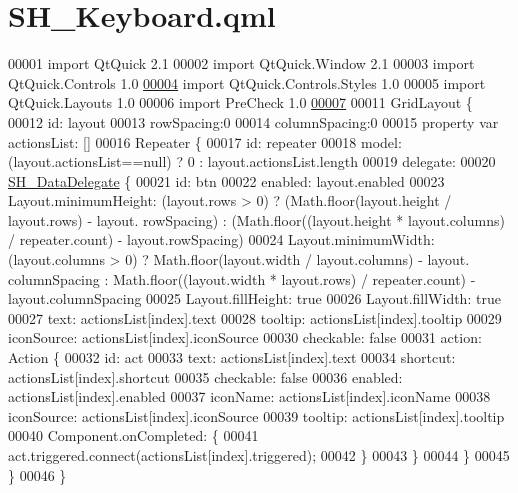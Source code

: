 \hypertarget{SH__Keyboard_8qml}{\section{S\-H\-\_\-\-Keyboard.\-qml}
\label{SH__Keyboard_8qml}
}

\begin{DoxyCode}
00001 \textcolor{keyword}{import} QtQuick 2.1
00002 import QtQuick.Window 2.1
00003 import QtQuick.Controls 1.0
\hypertarget{SH__Keyboard_8qml_source_l00004}{}\hyperlink{classSH__Keyboard}{00004} import QtQuick.Controls.Styles 1.0
00005 import QtQuick.Layouts 1.0
00006 import PreCheck 1.0
\hypertarget{SH__Keyboard_8qml_source_l00007}{}\hyperlink{classSH__Keyboard_a0fafeb62ceee0f38c8d7d9d5919795e5}{00007} 
00011 GridLayout \{
00012     \textcolor{keywordtype}{id}: layout
00013     rowSpacing:0
00014     columnSpacing:0
00015     \textcolor{keyword}{property} var actionsList: []
00016     Repeater \{
00017         \textcolor{keywordtype}{id}: repeater
00018         model: (layout.actionsList==null) ? 0 :  layout.actionsList.length
00019         delegate:
00020             \hyperlink{classSH__DataDelegate}{SH\_DataDelegate} \{
00021             \textcolor{keywordtype}{id}: btn
00022             enabled: layout.enabled
00023             Layout.minimumHeight: (layout.rows > 0) ? (Math.floor(layout.height / layout.rows) - layout.
      rowSpacing) : (Math.floor((layout.height * layout.columns) / repeater.count) - layout.rowSpacing)
00024             Layout.minimumWidth: (layout.columns > 0) ? Math.floor(layout.width / layout.columns) - layout.
      columnSpacing : Math.floor((layout.width * layout.rows) / repeater.count) - layout.columnSpacing
00025             Layout.fillHeight: \textcolor{keyword}{true}
00026             Layout.fillWidth: \textcolor{keyword}{true}
00027             text: actionsList[index].text
00028             tooltip: actionsList[index].tooltip
00029             iconSource: actionsList[index].iconSource
00030             checkable: \textcolor{keyword}{false}
00031             action: Action \{
00032                 \textcolor{keywordtype}{id}: act
00033                 text: actionsList[index].text
00034                 shortcut: actionsList[index].shortcut
00035                 checkable: \textcolor{keyword}{false}
00036                 enabled: actionsList[index].enabled
00037                 iconName: actionsList[index].iconName
00038                 iconSource: actionsList[index].iconSource
00039                 tooltip: actionsList[index].tooltip
00040                 Component.onCompleted: \{
00041                     act.triggered.connect(actionsList[index].triggered);
00042                 \}
00043             \}
00044         \}
00045     \}
00046 \}
\end{DoxyCode}
